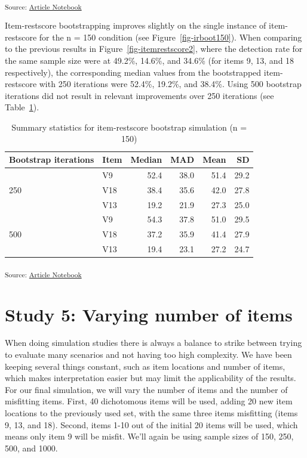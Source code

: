 \documentclass[
  letterpaper,
  DIV=11,
  numbers=noendperiod]{scrartcl}
\begin{document}
\textsubscript{Source:
\href{https://pgmj.github.io/rasch_itemfit/index.qmd.html}{Article
Notebook}}

Item-restscore bootstrapping improves slightly on the single instance of
item-restscore for the n = 150 condition (see
Figure~\ref{fig-irboot150}). When comparing to the previous results in
Figure~\ref{fig-itemrestscore2}, where the detection rate for the same
sample size were at 49.2\%, 14.6\%, and 34.6\% (for items 9, 13, and 18
respectively), the corresponding median values from the bootstrapped
item-restscore with 250 iterations were 52.4\%, 19.2\%, and 38.4\%.
Using 500 bootstrap iterations did not result in relevant improvements
over 250 iterations (see Table~\ref{tbl-irb150mis}).

\begin{longtable}[]{@{}llrrrr@{}}

\caption{\label{tbl-irb150mis}Summary statistics for item-restscore
bootstrap simulation (n = 150)}

\tabularnewline

\toprule\noalign{}
Bootstrap iterations & Item & Median & MAD & Mean & SD \\
\midrule\noalign{}
\endhead
\bottomrule\noalign{}
\endlastfoot
& V9 & 52.4 & 38.0 & 51.4 & 29.2 \\
250 & V18 & 38.4 & 35.6 & 42.0 & 27.8 \\
& V13 & 19.2 & 21.9 & 27.3 & 25.0 \\
& V9 & 54.3 & 37.8 & 51.0 & 29.5 \\
500 & V18 & 37.2 & 35.9 & 41.4 & 27.9 \\
& V13 & 19.4 & 23.1 & 27.2 & 24.7 \\

\end{longtable}

\textsubscript{Source:
\href{https://pgmj.github.io/rasch_itemfit/index.qmd.html}{Article
Notebook}}

\section{Study 5: Varying number of
items}\label{study-5-varying-number-of-items}

When doing simulation studies there is always a balance to strike
between trying to evaluate many scenarios and not having too high
complexity. We have been keeping several things constant, such as item
locations and number of items, which makes interpretation easier but may
limit the applicability of the results. For our final simulation, we
will vary the number of items and the number of misfitting items. First,
40 dichotomous items will be used, adding 20 new item locations to the
previously used set, with the same three items misfitting (items 9, 13,
and 18). Second, items 1-10 out of the initial 20 items will be used,
which means only item 9 will be misfit. We'll again be using sample
sizes of 150, 250, 500, and 1000.
\end{document}
